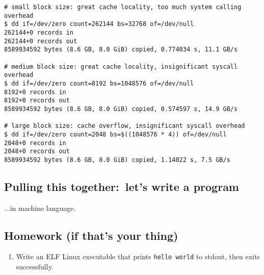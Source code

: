 \documentclass{article}
\begin{document}
  \begin{verbatim}
# small block size: great cache locality, too much system calling overhead
$ dd if=/dev/zero count=262144 bs=32768 of=/dev/null
262144+0 records in
262144+0 records out
8589934592 bytes (8.6 GB, 8.0 GiB) copied, 0.774034 s, 11.1 GB/s

# medium block size: great cache locality, insignificant syscall overhead
$ dd if=/dev/zero count=8192 bs=1048576 of=/dev/null
8192+0 records in
8192+0 records out
8589934592 bytes (8.6 GB, 8.0 GiB) copied, 0.574597 s, 14.9 GB/s

# large block size: cache overflow, insignificant syscall overhead
$ dd if=/dev/zero count=2048 bs=$((1048576 * 4)) of=/dev/null
2048+0 records in
2048+0 records out
8589934592 bytes (8.6 GB, 8.0 GiB) copied, 1.14022 s, 7.5 GB/s
  \end{verbatim}

  \subsection{Pulling this together:~let's write a program}
  ...in machine language.

  \subsection{Homework (if that's your thing)}
  \begin{enumerate}
    \item Write an ELF Linux executable that prints {\tt hello world} to stdout,
          then exits successfully.
  \end{enumerate}
\end{document}
